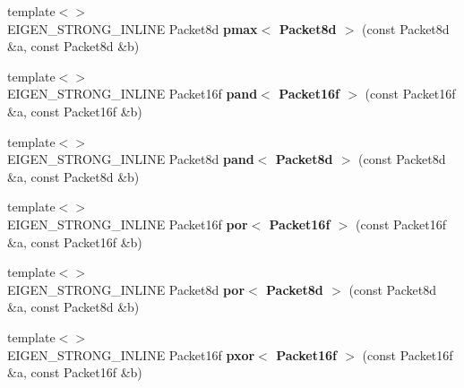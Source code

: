 \begin{DoxyCompactItemize}
\item 
\mbox{\label{namespace_eigen_1_1internal_a8692d994952e63b1715ddf34e16e3106}} 
{\footnotesize template$<$$>$ }\\E\+I\+G\+E\+N\+\_\+\+S\+T\+R\+O\+N\+G\+\_\+\+I\+N\+L\+I\+NE Packet8d {\bfseries pmax$<$ Packet8d $>$} (const Packet8d \&a, const Packet8d \&b)
\item 
\mbox{\label{namespace_eigen_1_1internal_aa5b2b7463f933d894768c8e01720839c}} 
{\footnotesize template$<$$>$ }\\E\+I\+G\+E\+N\+\_\+\+S\+T\+R\+O\+N\+G\+\_\+\+I\+N\+L\+I\+NE Packet16f {\bfseries pand$<$ Packet16f $>$} (const Packet16f \&a, const Packet16f \&b)
\item 
\mbox{\label{namespace_eigen_1_1internal_ad3683ea9beeda63a49216d8f729ec4d5}} 
{\footnotesize template$<$$>$ }\\E\+I\+G\+E\+N\+\_\+\+S\+T\+R\+O\+N\+G\+\_\+\+I\+N\+L\+I\+NE Packet8d {\bfseries pand$<$ Packet8d $>$} (const Packet8d \&a, const Packet8d \&b)
\item 
\mbox{\label{namespace_eigen_1_1internal_a2cb5b927adefae406a15ad4282d457ad}} 
{\footnotesize template$<$$>$ }\\E\+I\+G\+E\+N\+\_\+\+S\+T\+R\+O\+N\+G\+\_\+\+I\+N\+L\+I\+NE Packet16f {\bfseries por$<$ Packet16f $>$} (const Packet16f \&a, const Packet16f \&b)
\item 
\mbox{\label{namespace_eigen_1_1internal_a7059b12e1632b79ad7af111f5bbac1f6}} 
{\footnotesize template$<$$>$ }\\E\+I\+G\+E\+N\+\_\+\+S\+T\+R\+O\+N\+G\+\_\+\+I\+N\+L\+I\+NE Packet8d {\bfseries por$<$ Packet8d $>$} (const Packet8d \&a, const Packet8d \&b)
\item 
\mbox{\label{namespace_eigen_1_1internal_a2cac2f3583bca2b5650767e30c1df65f}} 
{\footnotesize template$<$$>$ }\\E\+I\+G\+E\+N\+\_\+\+S\+T\+R\+O\+N\+G\+\_\+\+I\+N\+L\+I\+NE Packet16f {\bfseries pxor$<$ Packet16f $>$} (const Packet16f \&a, const Packet16f \&b)
\item 
\mbox{\label{namespace_eigen_1_1internal_ae6343c1d2791f6c9b239ee994a1784fd}} 

\end{DoxyCompactItemize}
